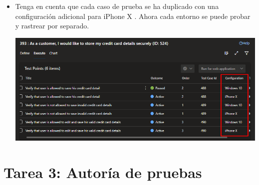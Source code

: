 \begin{itemize}
\item Tenga en cuenta que cada caso de prueba se ha duplicado con una configuración adicional para iPhone X . Ahora cada entorno se puede probar y rastrear por separado.
\begin{center}
\includegraphics[width=\columnwidth]{images/48}\newline
\end{center}
\end{itemize}

\section{Tarea 3: Autoría de pruebas} 

